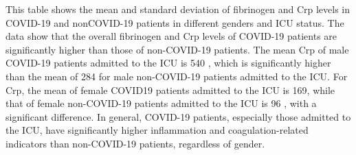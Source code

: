 \documentclass[10pt]{article}
\begin{document}
\begin{center}
\end{center}

\noindent This table shows the mean and standard deviation of fibrinogen and Crp levels in COVID-19 and nonCOVID-19 patients in different genders and ICU status. The data show that the overall fibrinogen and Crp levels of COVID-19 patients are significantly higher than those of non-COVID-19 patients. The mean Crp of male COVID-19 patients admitted to the ICU is 540 , which is significantly higher than the mean of 284 for male non-COVID-19 patients admitted to the ICU. For Crp, the mean of female COVID19 patients admitted to the ICU is 169, while that of female non-COVID-19 patients admitted to the ICU is 96 , with a significant difference. In general, COVID-19 patients, especially those admitted to the ICU, have significantly higher inflammation and coagulation-related indicators than non-COVID-19 patients, regardless of gender.
\end{document}
